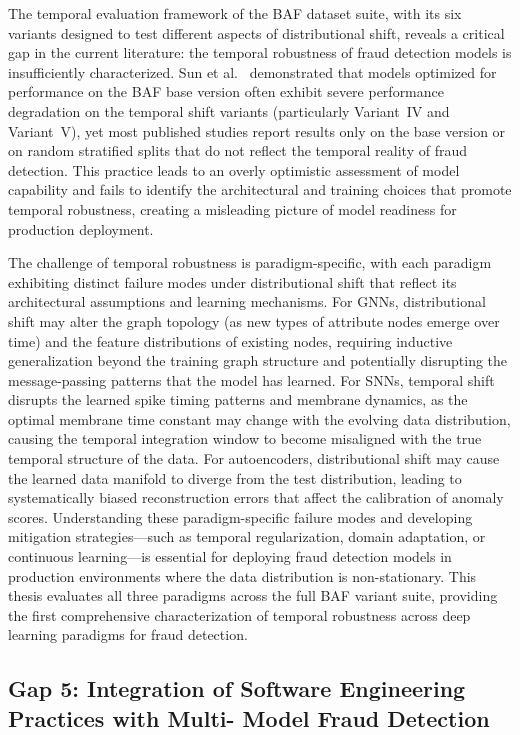 The temporal evaluation framework of the BAF dataset suite, with its six
variants designed to test different aspects of distributional shift, reveals a
critical gap in the current literature: the temporal robustness of fraud
detection models is insufficiently characterized. Sun et
al.~\cite{sun2025objective} demonstrated that models optimized for performance
on the BAF base version often exhibit severe performance degradation on the
temporal shift variants (particularly Variant~IV and Variant~V), yet most
published studies report results only on the base version or on random
stratified splits that do not reflect the temporal reality of fraud detection.
This practice leads to an overly optimistic assessment of model capability and
fails to identify the architectural and training choices that promote temporal
robustness, creating a misleading picture of model readiness for production
deployment.

The challenge of temporal robustness is paradigm-specific, with each paradigm
exhibiting distinct failure modes under distributional shift that reflect its
architectural assumptions and learning mechanisms. For GNNs, distributional
shift may alter the graph topology (as new types of attribute nodes emerge over
time) and the feature distributions of existing nodes, requiring inductive
generalization beyond the training graph structure and potentially disrupting
the message-passing patterns that the model has learned. For SNNs, temporal
shift disrupts the learned spike timing patterns and membrane dynamics, as the
optimal membrane time constant may change with the evolving data distribution,
causing the temporal integration window to become misaligned with the true
temporal structure of the data. For autoencoders, distributional shift may cause
the learned data manifold to diverge from the test distribution, leading to
systematically biased reconstruction errors that affect the calibration of
anomaly scores. Understanding these paradigm-specific failure modes and
developing mitigation strategies---such as temporal regularization, domain
adaptation, or continuous learning---is essential for deploying fraud detection
models in production environments where the data distribution is non-stationary.
This thesis evaluates all three paradigms across the full BAF variant suite,
providing the first comprehensive characterization of temporal robustness across
deep learning paradigms for fraud detection.

\subsection{Gap 5: Integration of Software Engineering Practices with Multi-
Model Fraud Detection}

